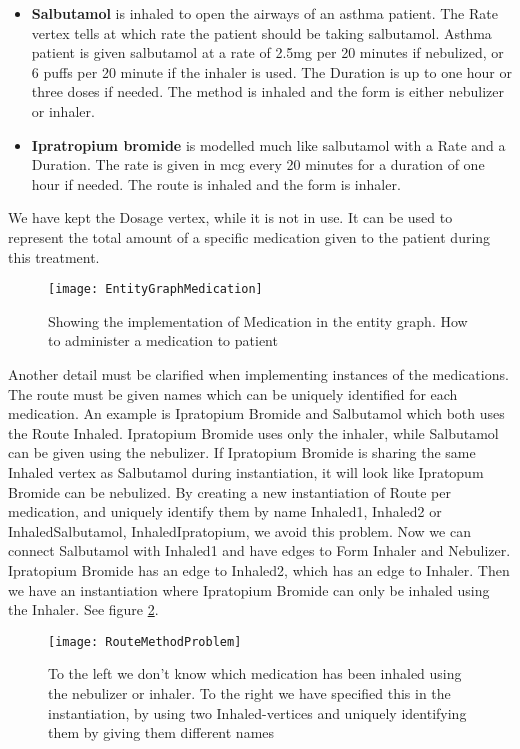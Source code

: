 \begin{itemize}
	\item \textbf{Salbutamol} is inhaled to open the airways of an asthma patient. The Rate vertex tells at which rate the patient should be taking salbutamol. Asthma patient is given salbutamol at a rate of 2.5mg per 20 minutes if nebulized, or 6 puffs per 20 minute if the inhaler is used. The Duration is up to one hour or three doses if needed. The method is inhaled and the form is either nebulizer or inhaler.
	
	\item \textbf{Ipratropium bromide} is modelled much like salbutamol with a Rate and a Duration. The rate is given in mcg every 20 minutes for a duration of one hour if needed. The route is inhaled and the form is inhaler.
\end{itemize}

 We have kept the Dosage vertex, while it is not in use. It can be used to represent the total amount of a specific medication given to the patient during this treatment.
 

\begin{figure}[h!]
	\texttt{[image: EntityGraphMedication]}
	\caption {Showing the implementation of Medication in the entity graph. How to administer a medication to patient}
	\label{fig:EntityGraphMedication}
\end{figure}

 Another detail must be clarified when implementing instances of the medications. The route must be given names which can be uniquely identified for each medication. An example is Ipratopium Bromide and Salbutamol which both uses the Route Inhaled. Ipratopium Bromide uses only the inhaler, while Salbutamol can be given using the nebulizer. If Ipratopium Bromide is sharing the same Inhaled vertex as Salbutamol during instantiation, it will look like Ipratopum Bromide can be nebulized. By creating a new instantiation of Route per medication, and uniquely identify them by name Inhaled1, Inhaled2 or InhaledSalbutamol, InhaledIpratopium, we avoid this problem. Now we can connect Salbutamol with Inhaled1 and have edges to Form Inhaler and Nebulizer. Ipratopium Bromide has an edge to Inhaled2, which has an edge to Inhaler. Then we have an instantiation where Ipratopium Bromide can only be inhaled using the Inhaler. See figure \ref{fig:RouteMethodProblem}.


\begin{figure}[h!]
	\texttt{[image: RouteMethodProblem]}
	\caption {To the left we don't know which medication has been inhaled using the nebulizer or inhaler. To the right we have specified this in the instantiation, by using two Inhaled-vertices and uniquely identifying them by giving them different names}
		\label{fig:RouteMethodProblem}
\end{figure}

